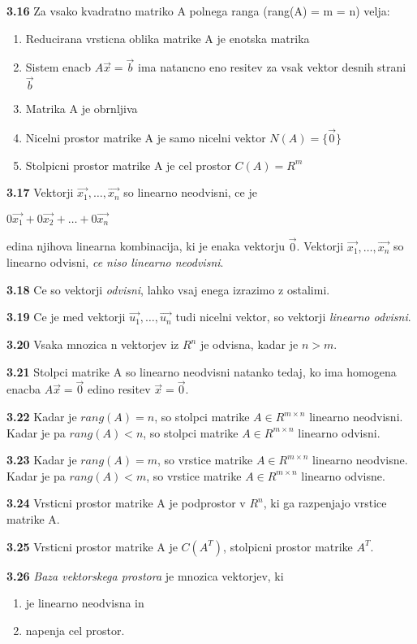 \documentclass{article}
\begin{document}
\begin{multicols}{4}
	\textbf{3.16} Za vsako kvadratno matriko A polnega ranga (rang(A) = m = n) velja:
	\begin{enumerate}
		\item Reducirana vrsticna oblika matrike A je enotska matrika
		\item Sistem enacb $A\vec{x} = \vec{b}$ ima natancno eno resitev za vsak vektor desnih strani $\vec{b}$
		\item Matrika A je obrnljiva
		\item Nicelni prostor matrike A je samo nicelni vektor $N(A) = \{\vec{0}\}$
		\item Stolpicni prostor matrike A je cel prostor $C(A) = R^{m}$
	\end{enumerate}

	\textbf{3.17} Vektorji $\vec{x_{1}}, \dots,\vec{x_{n}}$ so linearno neodvisni, ce je
	\begin{center}
		$ 0\vec{x_{1}} + 0\vec{x_{2}} + \dots + 0\vec{x_{n}}$
	\end{center}
	edina njihova linearna kombinacija, ki je enaka vektorju $\vec{0}$. Vektorji $\vec{x_{1}}, \dots,\vec{x_{n}}$ so
	linearno odvisni, \textit{ce niso linearno neodvisni}.

	\textbf{3.18} Ce so vektorji \textit{odvisni}, lahko vsaj enega izrazimo z ostalimi.

	\textbf{3.19} Ce je med vektorji  $\vec{u_{1}}, \dots,\vec{u_{n}}$ tudi nicelni vektor, so
	vektorji \textit{linearno odvisni}.

	\textbf{3.20} Vsaka mnozica n vektorjev iz $R^{n}$ je odvisna, kadar je $n > m $.

	\textbf{3.21} Stolpci matrike A so linearno neodvisni natanko tedaj, ko ima homogena enacba
	$A\vec{x} = \vec{0}$ edino resitev $\vec{x} = \vec{0}$.

	\textbf{3.22} Kadar je $rang(A) = n$, so stolpci matrike $A \in R^{m \times n}$ linearno
	neodvisni. Kadar je pa $rang(A) < n$, so stolpci matrike $A \in R^{m \times n}$ linearno odvisni.

	\textbf{3.23} Kadar je $rang(A) = m$, so vrstice matrike $A \in R^{m \times n}$ linearno neodvisne.
	Kadar je pa $rang(A) < m$, so vrstice matrike $A \in R^{m \times n}$ linearno odvisne.

	\textbf{3.24} Vrsticni prostor matrike A je podprostor v $R^{n}$, ki ga razpenjajo vrstice matrike A.

	\textbf{3.25} Vrsticni prostor matrike A je $C(A^{T})$, stolpicni prostor matrike $A^{T}$.

	\textbf{3.26} \textit{Baza vektorskega prostora} je mnozica vektorjev, ki
	\begin{enumerate}
		\item je linearno neodvisna in
		\item napenja cel prostor.
	\end{enumerate}


\end{multicols}
\end{document}
